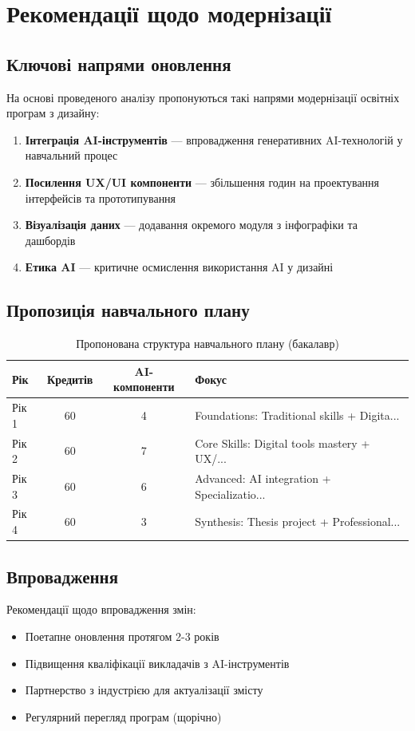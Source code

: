 \chapter{Рекомендації щодо модернізації}

\section{Ключові напрями оновлення}

На основі проведеного аналізу пропонуються такі напрями модернізації
освітніх програм з дизайну:

\begin{enumerate}
    \item \textbf{Інтеграція AI-інструментів} --- впровадження генеративних
    AI-технологій у навчальний процес
    \item \textbf{Посилення UX/UI компоненти} --- збільшення годин на
    проектування інтерфейсів та прототипування
    \item \textbf{Візуалізація даних} --- додавання окремого модуля з
    інфографіки та дашбордів
    \item \textbf{Етика AI} --- критичне осмислення використання AI у дизайні
\end{enumerate}

\section{Пропозиція навчального плану}


\begin{table}[H]
\centering
\caption{Пропонована структура навчального плану (бакалавр)}
\label{tab:curriculum_proposal}
\begin{tabular}{lccl}
\toprule
Рік & Кредитів & AI-компоненти & Фокус \\
\midrule
Рік 1 & 60 & 4 & Foundations: Traditional skills + Digita... \\
Рік 2 & 60 & 7 & Core Skills: Digital tools mastery + UX/... \\
Рік 3 & 60 & 6 & Advanced: AI integration + Specializatio... \\
Рік 4 & 60 & 3 & Synthesis: Thesis project + Professional... \\

\bottomrule
\end{tabular}
\end{table}


\section{Впровадження}

Рекомендації щодо впровадження змін:
\begin{itemize}
    \item Поетапне оновлення протягом 2-3 років
    \item Підвищення кваліфікації викладачів з AI-інструментів
    \item Партнерство з індустрією для актуалізації змісту
    \item Регулярний перегляд програм (щорічно)
\end{itemize}
